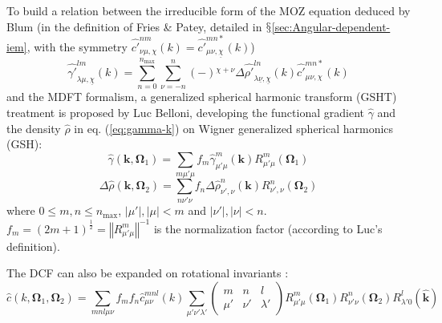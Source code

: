 To build a relation between the irreducible form of the \acs{MOZ}
equation deduced by Blum (in the definition of Fries \& Patey, detailed
in $\mathsection$\ref{sec:Angular-dependent-iem}, with the symmetry
$\hat{c'}_{\nu\mu,\chi}^{nm}(k)=\hat{c'}_{\mu\nu,\underline{\chi}}^{mn*}(k)$)
\begin{equation}
\hat{\gamma'}_{\lambda\mu,\underline{\chi}}^{lm}(k)=\sum_{n=0}^{n_{\mathrm{max}}}\sum_{\nu=-n}^{n}\left(-\right){}^{\chi+\nu}\Delta\hat{\rho'}_{\lambda\underline{\nu},\underline{\chi}}^{ln}(k)\hat{c'}_{\mu\nu,\chi}^{mn*}(k)\label{eq:Blum-reduced-OZ}
\end{equation}
and the \acs{MDFT} formalism, a generalized spherical harmonic transform
(\acs{GSHT}) treatment is proposed by Luc Belloni, developing the
functional gradient $\hat{\gamma}$ and the density $\hat{\rho}$
in eq. (\ref{eq:gamma-k}) on Wigner generalized spherical harmonics
(\acs{GSH}):
\begin{equation}
\hat{\gamma}(\mathbf{k},\mathbf{\Omega}_{1})=\sum_{m\mu'\mu}f_{m}\hat{\gamma}_{\mu'\mu}^{m}(\mathbf{k})R_{\mu'\mu}^{m}(\mathbf{\Omega}_{1})\label{eq:gamma-projection}
\end{equation}
\begin{equation}
\Delta\hat{\rho}(\mathbf{k},\mathbf{\Omega}_{2})=\sum_{n\nu'\nu}f_{n}\Delta\hat{\rho}_{\nu',\nu}^{n}(\mathbf{k})R_{\nu',\nu}^{n}(\mathbf{\Omega}_{2})\label{eq:delta-rho-projection}
\end{equation}
where $0\leq m,n\leq n_{\mathrm{max}}$, $\left|\mu'\right|,\left|\mu\right|<m$
and $\left|\nu'\right|,\left|\nu\right|<n$. $f_{m}=\left(2m+1\right)^{\frac{1}{2}}=\left\Vert R_{\mu'\mu}^{m}\right\Vert ^{-1}$
is the normalization factor (according to Luc's definition).

The \acs{DCF} can also be expanded on rotational invariants \citep{Fries_Patey_1985}:
\begin{equation}
\hat{c}(k,\mathbf{\Omega}_{1},\mathbf{\Omega}_{2})=\sum_{mnl\mu\nu}f_{m}f_{n}\hat{c}_{\mu\nu}^{mnl}(k)\sum_{\mu'\nu'\lambda'}\left(\begin{array}{ccc}
m & n & l\\
\mu' & \nu' & \lambda'
\end{array}\right)R_{\mu'\mu}^{m}(\mathbf{\Omega}_{1})R_{\nu'\nu}^{n}(\mathbf{\Omega}_{2})R_{\lambda'0}^{l}(\hat{\mathbf{k}})\label{eq:c-projection}
\end{equation}

